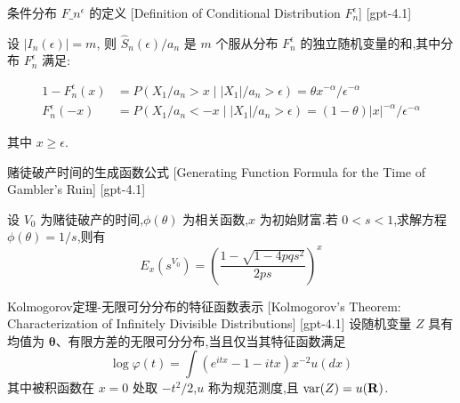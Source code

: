 \documentclass[UTF8]{ctexart}
\begin{document}
    
    
    \begin{dfn}
        {条件分布 $F\_n^{\epsilon}$ 的定义}
        [Definition of Conditional Distribution $F_n^{\epsilon}$]
        [gpt-4.1]
        
设 $|I_n(\epsilon)| = m$, 则 $\hat{S}_n(\epsilon)/a_n$ 是 $m$ 个服从分布 $F_n^{\epsilon}$ 的独立随机变量的和,其中分布 $F_n^{\epsilon}$ 满足:

\[
\begin{array}{rl}
1 - F_n^{\epsilon}(x) &= P(X_1 / a_n > x \mid |X_1| / a_n > \epsilon) = \theta x^{-\alpha} / \epsilon^{-\alpha} \\
F_n^{\epsilon}(-x) &= P(X_1 / a_n < -x \mid |X_1| / a_n > \epsilon) = (1 - \theta)|x|^{-\alpha} / \epsilon^{-\alpha}
\end{array}
\]

其中 $x \geq \epsilon$.

    \end{dfn}
    
    
    
    \begin{thm}
        {赌徒破产时间的生成函数公式}
        [Generating Function Formula for the Time of Gambler's Ruin]
        [gpt-4.1]
        
设 $V_0$ 为赌徒破产的时间,$\phi(\theta)$ 为相关函数,$x$ 为初始财富.若 $0 < s < 1$,求解方程 $\phi(\theta) = 1/s$,则有
\[
E_{x}(s^{V_{0}}) = \left( \frac{1 - \sqrt{1 - 4pqs^{2}}}{2ps} \right)^{x}
\]

    \end{thm}
    
    
    
    \begin{thm}
        {Kolmogorov定理-无限可分分布的特征函数表示}
        [Kolmogorov's Theorem: Characterization of Infinitely Divisible Distributions]
        [gpt-4.1]
        设随机变量 $Z$ 具有均值为 $\boldsymbol{\theta}$、有限方差的无限可分分布,当且仅当其特征函数满足
\[
\log{ \varphi(t) } = \int ( e^{i t x} - 1 - i t x ) x^{-2} 
u(dx)
\]
其中被积函数在 $x=0$ 处取 $- t^{2} / 2$,$
u$ 称为规范测度,且 $\operatorname{var}(Z) = 
u({\bf R})$.

    \end{thm}
    
    
    
\end{document}
